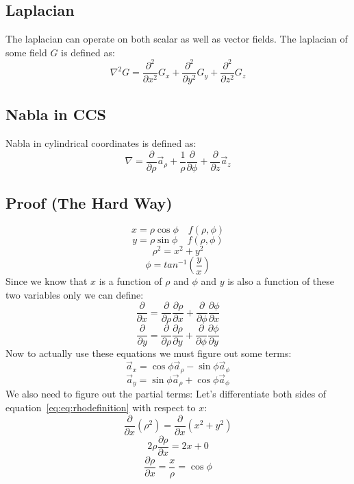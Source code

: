         \subsection{Laplacian}
            The laplacian can operate on both scalar as well as vector fields. The laplacian of some field $G$ is defined as:
            $$\nabla^2G = \frac{\partial^2}{\partial x^2}G_x + \frac{\partial^2}{\partial y^2}G_y + \frac{\partial^2}{\partial z^2}G_z$$
        \subsection{Nabla in CCS}
            Nabla in cylindrical coordinates is defined as:
            $$\nabla = \frac{\partial}{\partial \rho}\vec{a}_\rho + \frac{1}{\rho}\frac{\partial}{\partial \phi} + \frac{\partial}{\partial z}\vec{a}_z$$
            \subsection{Proof (The Hard Way)}
                $$x = \rho\cos\phi \quad f(\rho, \phi)$$
                $$y = \rho\sin\phi \quad f(\rho, \phi)$$
                \begin{equation}\label{eq:rhodefinition}
                    \rho^2 = x^2 + y^2
                \end{equation}
                $$\phi = tan^{-1}\left(\frac{y}{x}\right)$$
                Since we know that $x$ is a function of $\rho$ and $\phi$ and $y$ is also a function of these two variables only we can define:
                $$\frac{\partial}{\partial x} = \frac{\partial}{\partial \rho}\frac{\partial \rho}{\partial x} + \frac{\partial}{\partial \phi }\frac{\partial \phi}{\partial x}$$
                $$\frac{\partial}{\partial y} = \frac{\partial}{\partial \rho}\frac{\partial \rho}{\partial y} + \frac{\partial}{\partial \phi }\frac{\partial \phi}{\partial y}$$
                Now to actually use these equations we must figure out some terms:
                $$\vec{a}_x = \cos\phi\vec{a}_\rho - \sin\phi\vec{a}_\phi$$
                $$\vec{a}_y = \sin\phi\vec{a}_\rho + \cos\phi\vec{a}_\phi$$
                We also need to figure out the partial terms:
                Let's differentiate both sides of equation~\ref{eq:eq:rhodefinition} with respect to $x$:
                $$\frac{\partial}{\partial x}\left(\rho^2\right)=\frac{\partial}{\partial x}\left(x^2 + y^2\right)$$
                $$2\rho\frac{\partial \rho}{\partial x} = 2x + 0$$
                $$\frac{\partial \rho}{\partial x} = \frac{x}{\rho} = \cos\phi$$
